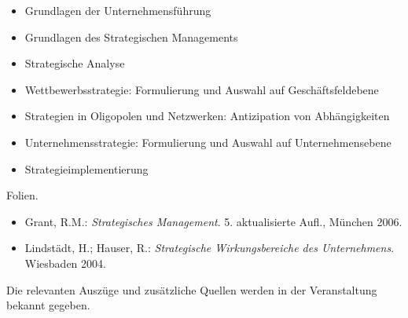 \begin{course}
\begin{content}
\begin{itemize}\item Grundlagen der Unternehmensführung  \item Grundlagen des Strategischen Managements  \item Strategische Analyse  \item Wettbewerbsstrategie: Formulierung und Auswahl auf Geschäftsfeldebene  \item Strategien in Oligopolen und Netzwerken: Antizipation von Abhängigkeiten  \item Unternehmensstrategie: Formulierung und Auswahl auf Unternehmensebene  \item Strategieimplementierung  \end{itemize}
\end{content}

\begin{media}Folien.

\end{media}

\begin{literature}\begin{itemize}\item Grant, R.M.: \emph{Strategisches Management}. 5. aktualisierte Aufl., München 2006.  \item Lindstädt, H.; Hauser, R.: \emph{Strategische Wirkungsbereiche des Unternehmens}. Wiesbaden 2004.  \end{itemize}

Die relevanten Auszüge und zusätzliche Quellen werden in der Veranstaltung bekannt gegeben.

\end{literature}



\end{course}